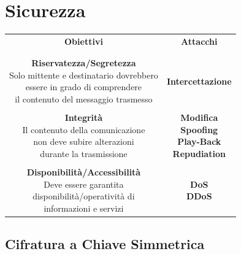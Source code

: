 \documentclass[10pt]{article}
\begin{document}
{\section{Sicurezza}
\begin{center}
	\begin{tabular}{c c}
	\textbf{Obiettivi} & \textbf{Attacchi} \\
	 & \\
	 & \\
	\makecell{\textbf{Riservatezza/Segretezza}\\Solo mittente e destinatario dovrebbero\\ essere in grado di comprendere\\il contenuto del messaggio trasmesso} & \textbf{Intercettazione} \\
	 & \\
	\makecell{\textbf{Integrità}\\Il contenuto della comunicazione\\non deve subire alterazioni\\durante la trasmissione} & \makecell{\textbf{Modifica}\\\textbf{Spoofing}\\\textbf{Play-Back}\\\textbf{Repudiation}} \\
	 & \\
	\makecell{\textbf{Disponibilità/Accessibilità}\\Deve essere garantita\\disponibilità/operatività di\\informazioni e servizi} & \makecell{\textbf{DoS}\\\textbf{DDoS}} \\
	\end{tabular}
\end{center}
\subsection{Cifratura a Chiave Simmetrica}
}
\end{document}
